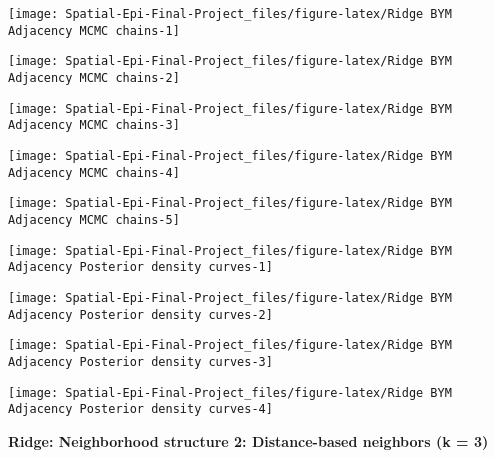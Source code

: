 \documentclass[]{article}
\begin{document}
\begin{center}\texttt{[image: Spatial-Epi-Final-Project\_files/figure-latex/Ridge BYM Adjacency MCMC chains-1]} \end{center}

\begin{center}\texttt{[image: Spatial-Epi-Final-Project\_files/figure-latex/Ridge BYM Adjacency MCMC chains-2]} \end{center}

\begin{center}\texttt{[image: Spatial-Epi-Final-Project\_files/figure-latex/Ridge BYM Adjacency MCMC chains-3]} \end{center}

\begin{center}\texttt{[image: Spatial-Epi-Final-Project\_files/figure-latex/Ridge BYM Adjacency MCMC chains-4]} \end{center}

\begin{center}\texttt{[image: Spatial-Epi-Final-Project\_files/figure-latex/Ridge BYM Adjacency MCMC chains-5]} \end{center}

\begin{center}\texttt{[image: Spatial-Epi-Final-Project\_files/figure-latex/Ridge BYM Adjacency Posterior density curves-1]} \end{center}

\begin{center}\texttt{[image: Spatial-Epi-Final-Project\_files/figure-latex/Ridge BYM Adjacency Posterior density curves-2]} \end{center}

\begin{center}\texttt{[image: Spatial-Epi-Final-Project\_files/figure-latex/Ridge BYM Adjacency Posterior density curves-3]} \end{center}

\begin{center}\texttt{[image: Spatial-Epi-Final-Project\_files/figure-latex/Ridge BYM Adjacency Posterior density curves-4]} \end{center}

\textbf{Ridge: Neighborhood structure 2: Distance-based neighbors (k =
3)}
\end{document}
